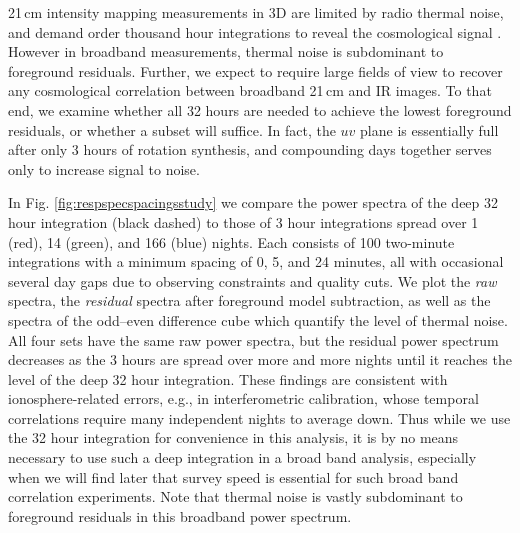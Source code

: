\documentclass[preprint]{aastex}
\begin{document}
21\,cm intensity mapping measurements in 3D are limited by radio thermal noise, and demand order thousand hour integrations to reveal the cosmological signal \citep{beardsley13,PoberNextGen}. However in broadband measurements, thermal noise is subdominant to foreground residuals. Further, we expect to require large fields of view to recover any cosmological correlation between broadband 21\,cm and IR images. To that end, we examine whether all 32 hours are needed to achieve the lowest foreground residuals, or whether a subset will suffice. In fact, the $uv$ plane is essentially full after only 3 hours of rotation synthesis, and compounding days together serves only to increase signal to noise. 

In Fig. \ref{fig:respspecspacingsstudy} we compare the power spectra of the deep 32 hour integration (black dashed) to those of 3 hour integrations spread over 1 (red), 14 (green), and 166 (blue) nights. Each consists of 100 two-minute integrations with a minimum spacing of 0, 5, and 24 minutes, all with occasional several day gaps due to observing constraints and quality cuts. We plot the \textit{raw} spectra, the \textit{residual} spectra after foreground model subtraction, as well as the spectra of the odd--even difference cube which quantify the level of thermal noise. All four sets have the same raw power spectra, but the residual power spectrum decreases as the 3 hours are spread over more and more nights until it reaches the level of the deep 32 hour integration. These findings are consistent with ionosphere-related errors, e.g., in interferometric calibration, whose temporal correlations require many independent nights to average down. Thus while we use the 32 hour integration for convenience in this analysis, it is by no means necessary to use such a deep integration in a broad band analysis, especially when we will find later that survey speed is essential for such broad band correlation experiments. Note that thermal noise is vastly subdominant to foreground residuals in this broadband power spectrum.
\end{document}

